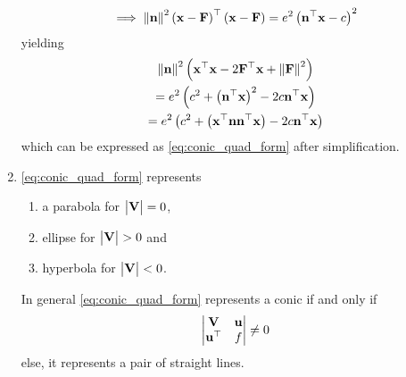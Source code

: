 \documentclass[journal,12pt,twocolumn]{IEEEtran}
\renewcommand\thesection{\arabic{section}}
\renewcommand\thesubsection{\thesection.\arabic{subsection}}
\begin{document}
\begin{enumerate}[label=\thesubsection.\arabic*.,ref=\thesubsection.\theenumi]
\begin{align}
			\implies \left\lVert\mathbf{n}\right\rVert^2\left(\mathbf{x}-\mathbf{F}\right)^{\top}\left(\mathbf{x}-\mathbf{F}\right)=e^2\left(\mathbf{n}^{\top}\mathbf{x} - c\right)^2
    \end{align}
    yielding
\begin{multline}
\left\lVert\mathbf{n}\right\rVert^2\left(\mathbf{x}^{\top}\mathbf{x}-2\mathbf{F}^{\top}\mathbf{x}+\left\lVert\mathbf{F}\right\rVert^2\right)
	\\
	=e^2\left(c^2+\left(\mathbf{n}^{\top}\mathbf{x} \right)^2-2c\mathbf{n}^{\top}\mathbf{x}\right) 
	\\
=e^2\left(c^2+\left(\mathbf{x}^{\top}\mathbf{n}\mathbf{n}^{\top}\mathbf{x} \right)-2c\mathbf{n}^{\top}\mathbf{x}\right)
\end{multline}
%
which can be expressed as \eqref{eq:conic_quad_form} after simplification.
\item \eqref{eq:conic_quad_form} represents 
	\begin{enumerate}
		\item a parabola for $\begin{vmatrix}\mathbf{V}\end{vmatrix} = 0 $,
		\item ellipse for $\begin{vmatrix}\mathbf{V}\end{vmatrix} > 0 $ and 
		\item hyperbola for $\begin{vmatrix}\mathbf{V}\end{vmatrix} < 0 $.
	\end{enumerate}
			In general
\eqref{eq:conic_quad_form}  represents a conic  if and only if
\begin{align}
\begin{vmatrix}
\mathbf{V}&\mathbf{u}
\\
\mathbf{u}^{\top}&f
\end{vmatrix}
\ne  0
\label{eq:quad_forms_pair_det}
\end{align}
%
else, it represents a pair of straight lines.
\end{enumerate}
\end{document}
